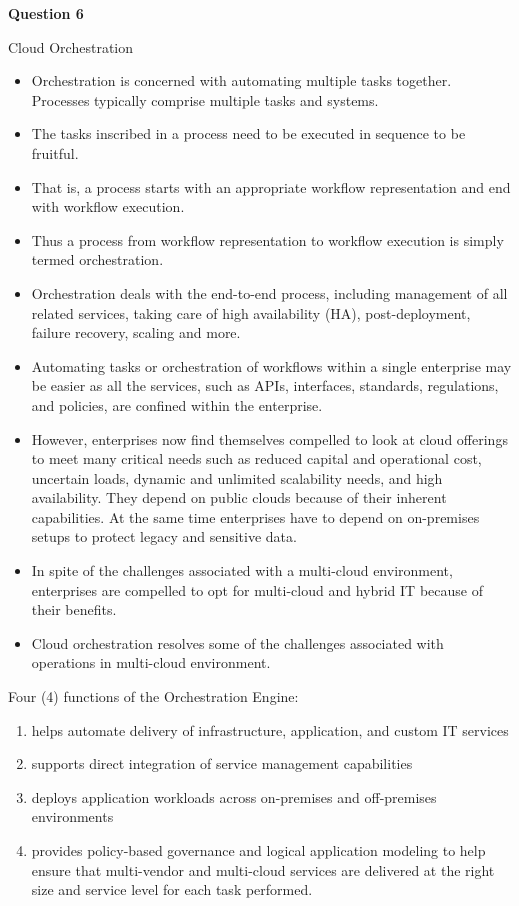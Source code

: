 \documentclass[a4paper, 12pt]{article}
\begin{document}
\newpage
\begin{center}
	\textbf{Question 6}
\end{center}

Cloud Orchestration
\begin{itemize}
\item
Orchestration is concerned with automating multiple tasks together. Processes typically comprise multiple tasks and systems.
\item
The tasks inscribed in a process need to be executed in sequence to be fruitful.
\item
That is, a process starts with an appropriate workflow representation and end with workflow execution. 
\item
Thus a process from workflow representation to workflow execution is simply termed orchestration.
\item
Orchestration deals with the end-to-end process, including management of all related services, taking care of high availability (HA), post-deployment, failure recovery, scaling and more. 
\item
Automating tasks or orchestration of workflows within a single enterprise may be easier as all the services, such as APIs, interfaces, standards, regulations, and policies, are confined within the enterprise. 
\item
However, enterprises now find themselves compelled to look at cloud offerings to meet many critical needs such as reduced capital and operational cost, uncertain loads, dynamic and unlimited scalability needs, and high availability. They depend on public clouds because of their inherent capabilities. At the same time enterprises have to depend on on-premises setups to protect legacy and sensitive data. 
\item
In spite of the challenges associated with a multi-cloud environment, enterprises are compelled to opt for multi-cloud and hybrid IT because of their benefits. 
\item
Cloud orchestration resolves some of the challenges associated with operations in multi-cloud environment. 
\end{itemize}

Four (4) functions of the Orchestration Engine:
\begin{enumerate}
\item
helps automate delivery of infrastructure, application, and custom IT services
\item
supports direct integration of service management capabilities
\item
deploys application workloads across on-premises and off-premises environments
\item
provides policy-based governance and logical application modeling to help ensure that multi-vendor and multi-cloud services are delivered at the right size and service level for each task performed.
\end{enumerate}
\end{document}
